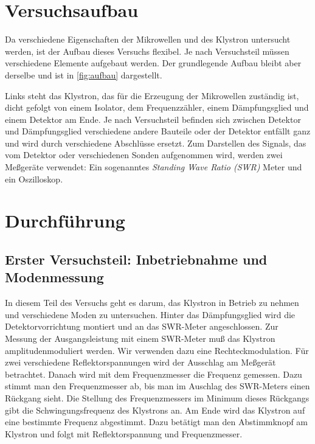 
\section{Versuchsaufbau}

Da verschiedene Eigenschaften der Mikrowellen und des Klystron
untersucht werden, ist der Aufbau dieses Versuchs flexibel.  Je nach
Versuchsteil müssen verschiedene Elemente aufgebaut werden.  Der
grundlegende Aufbau bleibt aber derselbe und ist in \cref{fig:aufbau}
dargestellt.

Links steht das Klystron, das für die Erzeugung der Mikrowellen
zuständig ist, dicht gefolgt von einem Isolator, dem Frequenzzähler,
einem Dämpfungsglied und einem Detektor am Ende. Je nach Versuchsteil
befinden sich zwischen Detektor und Dämpfungsglied verschiedene andere
Bauteile oder der Detektor entfällt ganz und wird durch verschiedene
Abschlüsse ersetzt.  Zum Darstellen des Signals, das vom Detektor oder
verschiedenen Sonden aufgenommen wird, werden zwei Meßgeräte verwendet:
Ein sogenanntes \emph{Standing Wave Ratio (SWR)} Meter und ein
Oszilloskop.

\section{Durchführung}

\subsection{Erster Versuchsteil: Inbetriebnahme und Modenmessung}

In diesem Teil des Versuchs geht es darum, das Klystron in Betrieb zu
nehmen und verschiedene Moden zu untersuchen.  Hinter das Dämpfungsglied
wird die Detektorvorrichtung montiert und an das SWR-Meter
angeschlossen.  Zur Messung der Ausgangsleistung mit einem SWR-Meter muß
das Klystron amplitudenmoduliert werden.  Wir verwenden dazu eine
Rechteckmodulation.  Für zwei verschiedene Reflektorspannungen wird der
Ausschlag am Meßgerät betrachtet.  Danach wird mit dem Frequenzmesser
die Frequenz gemessen.  Dazu stimmt man den Frequenzmesser ab, bis man
im Auschlag des SWR-Meters einen Rückgang sieht.  Die Stellung des
Frequenzmessers im Minimum dieses Rückgangs gibt die Schwingungsfrequenz
des Klystrons an.  Am Ende wird das Klystron auf eine bestimmte Frequenz
abgestimmt.  Dazu betätigt man den Abstimmknopf am Klystron und folgt
mit Reflektorspannung und Frequenzmesser.

